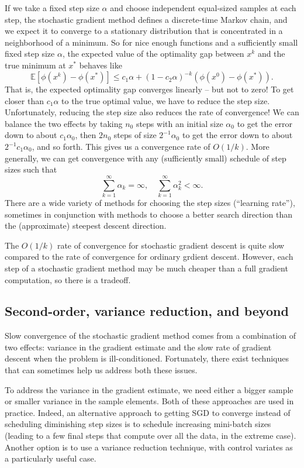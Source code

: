\documentclass[12pt, leqno]{article} %
\begin{document}
If we take a fixed step size \(\alpha\) and choose independent
equal-sized samples at each step, the stochastic gradient method defines
a discrete-time Markov chain, and we expect it to converge to a
stationary distribution that is concentrated in a neighborhood of a
minimum. So for nice enough functions and a sufficiently small fixed
step size \(\alpha\), the expected value of the optimality gap between
\(x^k\) and the true minimum at \(x^*\) behaves like
\[\mathbb{E}[\phi(x^k)-\phi(x^*)] 
    \leq c_1 \alpha + (1-c_2 \alpha)^{-k} \left( \phi(x^0)-\phi(x^*) \right).\]
That is, the expected optimality gap converges linearly -- but not to
zero! To get closer than \(c_1 \alpha\) to the true optimal value, we
have to reduce the step size. Unfortunately, reducing the step size also
reduces the rate of convergence! We can balance the two effects by
taking \(n_0\) steps with an initial size \(\alpha_0\) to get the error
down to about \(c_1 \alpha_0\), then \(2n_0\) steps of size
\(2^{-1} \alpha_0\) to get the error down to about
\(2^{-1} c_1 \alpha_0\), and so forth. This gives us a convergence rate
of \(O(1/k)\). More generally, we can get convergence with any
(sufficiently small) schedule of step sizes such that
\[\sum_{k=1}^\infty \alpha_k = \infty, \quad
  \sum_{k=1}^\infty \alpha_k^2 < \infty.\] There are a wide variety of
methods for choosing the step sizes (``learning rate''), sometimes in
conjunction with methods to choose a better search direction than the
(approximate) steepest descent direction.

The \(O(1/k)\) rate of convergence for stochastic gradient descent is
quite slow compared to the rate of convergence for ordinary grdient
descent. However, each step of a stochastic gradient method may be much
cheaper than a full gradient computation, so there is a tradeoff.

\subsection{Second-order, variance reduction, and beyond}

Slow convergence of the stochastic gradient method comes from a
combination of two effects: variance in the gradient estimate and the
slow rate of gradient descent when the problem is ill-conditioned.
Fortunately, there exist techniques that can sometimes help us address
both these issues.

To address the variance in the gradient estimate, we need either a
bigger sample or smaller variance in the sample elements. Both of these
approaches are used in practice. Indeed, an alternative approach to
getting SGD to converge instead of scheduling diminishing step sizes is
to schedule increasing mini-batch sizes (leading to a few final steps
that compute over all the data, in the extreme case). Another option is
to use a variance reduction technique, with control variates as a
particularly useful case.
\end{document}
